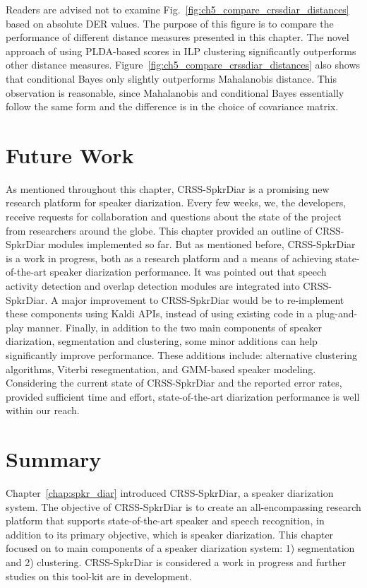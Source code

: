 Readers are advised not to examine Fig.~\ref{fig:ch5_compare_crssdiar_distances} based on absolute DER values. 
The purpose of this figure is to compare the performance of different distance measures presented in this chapter. 
The novel approach of using PLDA-based scores in ILP clustering significantly outperforms other distance measures. 
Figure~\ref{fig:ch5_compare_crssdiar_distances} also shows that conditional Bayes only slightly outperforms Mahalanobis distance. 
This observation is reasonable, since Mahalanobis and conditional Bayes essentially follow the same form and the difference is in the choice of covariance matrix. 

\section{Future Work}
\label{sec:chDiar_future}
As mentioned throughout this chapter, CRSS-SpkrDiar is a promising new research platform for speaker diarization. 
Every few weeks, we, the developers, receive requests for collaboration and questions about the state of the project from researchers around the globe. 
This chapter provided an outline of CRSS-SpkrDiar modules implemented so far. 
But as mentioned before, CRSS-SpkrDiar is a work in progress, both as a research platform and a means of achieving state-of-the-art speaker diarization performance. 
It was pointed out that speech activity detection and overlap detection modules are integrated into CRSS-SpkrDiar. 
A major improvement to CRSS-SpkrDiar would be to re-implement these components using Kaldi APIs, instead of using existing code in a plug-and-play manner. 
Finally, in addition to the two main components of speaker diarization, segmentation and clustering, some minor additions can help significantly improve performance. 
These additions include: alternative clustering algorithms, Viterbi resegmentation, and GMM-based speaker modeling. 
Considering the current state of CRSS-SpkrDiar and the reported error rates, provided sufficient time and effort, state-of-the-art diarization performance is well within our reach.


\section{Summary}
\label{sec:ch4_summary}
Chapter~\ref{chap:spkr_diar} introduced CRSS-SpkrDiar, a  speaker diarization system. 
The objective of CRSS-SpkrDiar is to create an all-encompassing research platform that supports state-of-the-art speaker and speech recognition, in addition to its primary objective, which is speaker diarization. 
This chapter focused on to main components of a speaker diarization system: 1) segmentation and 2) clustering. 
CRSS-SpkrDiar is considered a work in progress and further studies on this tool-kit are in development. 

